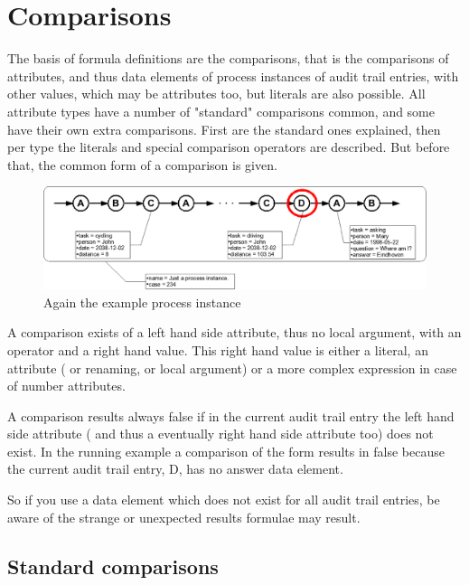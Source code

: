 \section{Comparisons}
\label{language:comparison}

The basis of formula definitions are the comparisons, that is the comparisons
of attributes, and thus data elements of process instances of audit trail
entries, with other values, which may be attributes too, but literals are also
possible. All attribute types have a number of "standard" comparisons common,
and some have their own extra comparisons. First are the standard ones
explained, then per type the literals and special comparison operators
are described. But
before that, the common form of a comparison is given.

\begin{figure}[H]
    \includegraphics[scale=0.30]{diagrams/current-process-instance.eps}
    \caption{Again the example process instance}
    \label{language:pi02}
\end{figure}

A comparison exists of a left hand side attribute, thus no local argument,
with an operator and a right hand value. This right hand value is either a
literal, an attribute ( or renaming, or local argument) or a more complex
expression in case of number attributes.

A comparison results always false if in the current audit trail entry the left
hand side attribute ( and thus a eventually right hand side attribute too)
does not exist. In the running example a comparison of the form  results in false because the current audit trail entry, D, has no
answer data element.

So if you use a data element which does not exist for all audit trail entries,
be aware of the strange or unexpected results formulae may result.

\subsection{Standard comparisons}


